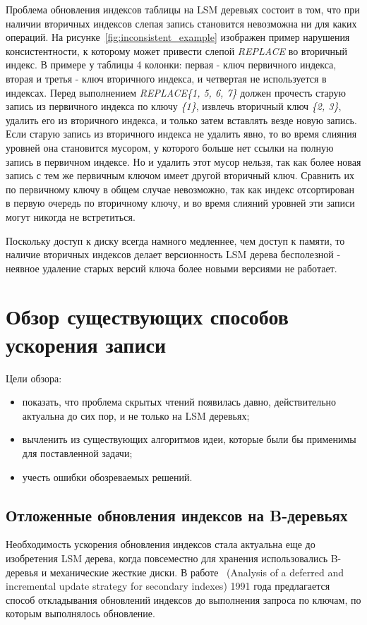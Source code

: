 \documentclass[a4paper,hidelinks,12pt]{article}
\begin{document}
Проблема обновления индексов таблицы на LSM деревьях состоит в том, что при
наличии вторичных индексов слепая запись становится невозможна ни для каких
операций. На рисунке~\ref{fig:inconsistent_example} изображен пример нарушения
консистентности, к которому может привести слепой \textit{REPLACE} во вторичный
индекс. В примере у таблицы 4 колонки: первая - ключ первичного индекса,
вторая и третья - ключ вторичного индекса, и четвертая не используется в
индексах. Перед выполнением \textit{REPLACE\{1, 5, 6, 7\}} должен прочесть
старую запись из первичного индекса по ключу \textit{\{1\}}, извлечь вторичный
ключ \textit{\{2, 3\}}, удалить его из вторичного индекса, и только затем
вставлять везде новую запись. Если старую запись из вторичного индекса не
удалить явно, то во время слияния уровней она становится мусором, у которого
больше нет ссылки на полную запись в первичном индексе. Но и удалить этот мусор
нельзя, так как более новая запись с тем же первичным ключом имеет другой
вторичный ключ. Сравнить их по первичному ключу в общем случае невозможно, так
как индекс отсортирован в первую очередь по вторичному ключу, и во время слияний
уровней эти записи могут никогда не встретиться.

Поскольку доступ к диску всегда намного медленнее, чем доступ к памяти, то
наличие вторичных индексов делает версионность LSM дерева бесполезной - неявное
удаление старых версий ключа более новыми версиями не работает.

\section{Обзор существующих способов ускорения записи}
Цели обзора:
\begin{itemize}
\item показать, что проблема скрытых чтений появилась давно, действительно
актуальна до сих пор, и не только на LSM деревьях;
\item вычленить из существующих алгоритмов идеи, которые были бы применимы для
поставленной задачи;
\item учесть ошибки обозреваемых решений.
\end{itemize}

\subsection{Отложенные обновления индексов на B-деревьях}
Необходимость ускорения обновления индексов стала актуальна еще до изобретения
LSM дерева, когда повсеместно для хранения использовались B-деревья и
механические жесткие диски. В работе~\cite{btree_update_def} (Analysis of a
deferred and incremental update strategy for secondary indexes) 1991 года
предлагается способ откладывания обновлений индексов до выполнения запроса по
ключам, по которым выполнялось обновление.
\end{document}
